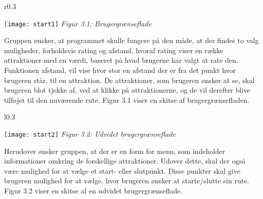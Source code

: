 \begin{wrapfigure}{r}{0.3\textwidth}
  \vspace{-20pt}
  \begin{center}
    \texttt{[image: start1]} \newline
    \textit{Figur 3.1: Brugergrænseflade}\newline
  \end{center}
  \vspace{-20pt}
  \vspace{-20pt}
\end{wrapfigure}


Gruppen ønsker, at programmet skulle fungere på den måde, at der findes to valg muligheder, forholdsvis rating og afstand, hvoraf rating viser en række attraktioner med en værdi, baseret på hvad brugerne har valgt at rate den. Funktionen afstand, vil vise hvor stor en afstand der er fra det punkt hvor brugeren står, til en attraktion. De attraktioner, som brugeren ønsker at se, skal brugeren blot tjekke af, ved at klikke på attraktionerne, og de vil derefter blive tilføjet til den nuværende rute. Figur 3.1 viser en skitse af brugergrænsefladen. \newline
\newline
\newline
\newline

\begin{wrapfigure}{l}{0.3\textwidth}
  \vspace{-50pt}
  \begin{center}
    \texttt{[image: start2]} \newline
    \textit{Figur 3.2: \newline Udvidet brugergrænseflade}\newline
  \end{center}
  \vspace{20pt}
\end{wrapfigure}

Herudover ønsker gruppen, at der er en form for menu, som indeholder informationer omkring de forskellige attraktioner. Udover dette, skal der også være mulighed for at vælge et start- eller slutpunkt. Disse punkter skal give brugeren mulighed for at vælge, hvor brugeren ønsker at starte/slutte sin rute. Figur 3.2 viser en skitse af en udvidet brugergrænseflade.\newline
\newline
\newline
\newline
\newline

